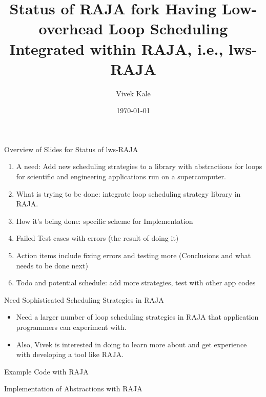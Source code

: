 \documentclass{beamer}
\title{Status of RAJA fork Having Low-overhead Loop Scheduling Integrated within RAJA, i.e., lws-RAJA}
\author{Vivek Kale}
\date{\today}
\begin{document}
 

\begin{frame}
\titlepage
\end{frame}

\begin{frame}[label=ovwlwsRAJAstatus]{Overview of Slides for Status of lws-RAJA}
\begin{enumerate}
\item A need: Add new scheduling strategies to a library with abstractions for loops for scientific and engineering applications run on a supercomputer.
\item What is trying to be done: integrate loop scheduling strategy library in RAJA.
\item How it's being done: specific scheme for Implementation 
\item Failed Test cases with errors (the result of doing it) 
\item Action items include fixing errors and testing more (Conclusions and what needs to be done next)
\item Todo and potential schedule: add more strategies, test with other app codes
\end{enumerate}
\end{frame}

\begin{frame}{Need Sophisticated Scheduling Strategies in RAJA}
\begin{itemize}
\item Need a larger number of loop scheduling strategies in RAJA that application programmers can experiment with.
\item Also, Vivek is interested in doing to learn more about and get experience with developing a tool like RAJA. 
\end{itemize} 
\end{frame}


\begin{frame}{Example Code with RAJA}
\begin{figure}[ht!] 

\end{figure}
\end{frame}

\begin{frame}{Implementation of Abstractions with RAJA}
\begin{figure}[ht!] 

\end{figure}
\end{frame}
\end{document}
